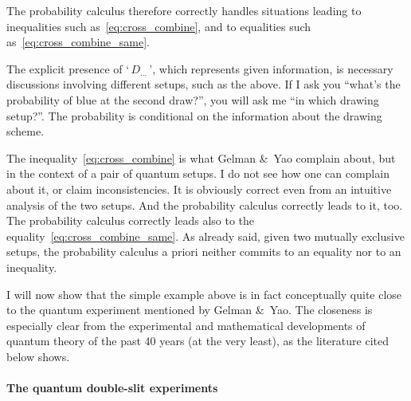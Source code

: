 \documentclass[\ifafour a4paper,12pt,\else a5paper,10pt,\fi%
onecolumn,oneside,article,%
british%
]{memoir}
\newcommand*{\defquote}[1]{`\,#1\,'}
\theoremstyle{remark}
\theoremstyle{innote}
\newcommand*{\citey}{\parencites*}
\newcommand*{\amp}{\&}
\renewcommand*{\|}[1][]{\nonscript\,#1\vert\nonscript\;\mathopen{}}
\begin{document}
The probability calculus therefore correctly handles situations leading to
inequalities such as~\eqref{eq:cross_combine}, and to equalities such
as~\eqref{eq:cross_combine_same}.

\medskip


The explicit presence of \defquote{$D_{\dotso}$}, which represents given
information, is necessary discussions involving different setups, such as
the above. If I ask you \enquote{what's the probability of blue at the
  second draw?}, you will ask me \enquote{in which drawing setup?}. The
probability is conditional on the information about the drawing scheme.


\medskip

The inequality~\eqref{eq:cross_combine} is what Gelman \amp\ Yao
\citey[p.~2]{gelmanetal2020} complain about, but in the context of a pair
of quantum setups. I do not see how one can complain about it, or claim
inconsistencies. It is obviously correct even from an intuitive analysis of
the two setups. And the probability calculus correctly leads to it, too.
The probability calculus correctly leads also to the
equality~\eqref{eq:cross_combine_same}. As already said, given two mutually
exclusive setups, the probability calculus a priori neither commits to an
equality nor to an inequality.


I will now show that the simple example above is in fact conceptually quite
close to the quantum experiment mentioned by Gelman \amp\ Yao. The
closeness is especially clear from the experimental and mathematical
developments of quantum theory of the past 40 years (at the very least), as
the literature cited below shows.

\bigskip

\paragraph{The quantum double-slit experiments}
\end{document}
